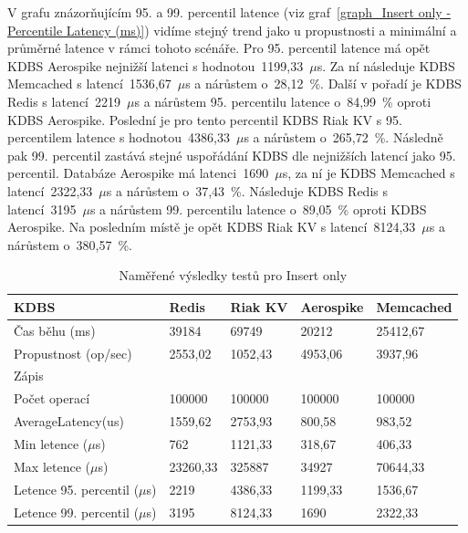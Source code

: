 \documentclass[czech,master,dept460,male,csharp,cpdeclaration]{diploma}
\begin{document}
	V grafu znázorňujícím 95. a 99. percentil latence (viz graf~\ref{graph_Insert only - Percentile Latency (ms)}) vidíme stejný trend jako u propustnosti a minimální a průměrné latence v rámci tohoto scénáře. Pro 95. percentil latence má opět KDBS Aerospike nejnižší latenci s hodnotou~1199,33~$\mu$s. Za ní následuje KDBS Memcached s latencí~1536,67~$\mu$s a nárůstem o~28,12~\%. Další v pořadí je KDBS Redis s latencí~2219~$\mu$s a nárůstem 95. percentilu latence o~84,99~\% oproti KDBS Aerospike. Poslední je pro tento percentil KDBS Riak KV s 95. percentilem latence s hodnotou~4386,33~$\mu$s a nárůstem o~265,72~\%. Následně pak 99. percentil zastává stejné uspořádání KDBS dle nejnižších latencí jako 95. percentil. Databáze Aerospike má latenci~1690~$\mu$s, za ní je KDBS Memcached s latencí~2322,33~$\mu$s a nárůstem o~37,43~\%. Následuje KDBS Redis s latencí~3195~$\mu$s a nárůstem 99. percentilu latence o~89,05~\% oproti KDBS Aerospike. Na posledním místě je opět KDBS Riak KV s latencí~8124,33~$\mu$s a nárůstem o~380,57~\%.
	
	\begin{table}
		\centering
		\begin{tabular}{ l | l l l l }
			\toprule
			KDBS & Redis & Riak KV & Aerospike & Memcached \\
			\midrule
			Čas běhu (ms) & 39184 & 69749 & 20212 & 25412,67 \\
			Propustnost (op/sec) & 2553,02 & 1052,43 & 4953,06 & 3937,96 \\
			\midrule
			\multicolumn{5}{l}{Zápis} \\
			Počet operací & 100000 & 100000 & 100000 & 100000 \\
			AverageLatency(us) & 1559,62 & 2753,93 & 800,58 & 983,52 \\
			Min letence ($\mu$s) & 762 & 1121,33 & 318,67 & 406,33 \\
			Max letence ($\mu$s) & 23260,33 & 325887 & 34927 & 70644,33 \\
			Letence 95. percentil ($\mu$s) & 2219 & 4386,33 & 1199,33 & 1536,67 \\
			Letence 99. percentil ($\mu$s) & 3195 & 8124,33 & 1690 & 2322,33 \\
			\bottomrule
		\end{tabular}
		\caption{Naměřené výsledky testů pro Insert only\label{tab_workload_insert_only}}
	\end{table}
	
\end{document}
